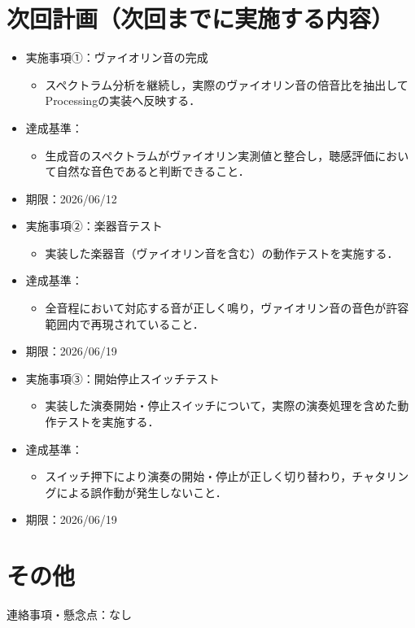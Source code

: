 \documentclass[lualatex,paper=a4paper,jafontsize=11.5pt,jafontscale=1.05]{jlreq}
\begin{document}
\section{次回計画（次回までに実施する内容）}
\begin{itemize}
  \item 実施事項①：ヴァイオリン音の完成
  \begin{itemize}
    \item スペクトラム分析を継続し，実際のヴァイオリン音の倍音比を抽出してProcessingの実装へ反映する．
  \end{itemize}
  \item 達成基準：
  \begin{itemize}
    \item 生成音のスペクトラムがヴァイオリン実測値と整合し，聴感評価において自然な音色であると判断できること．
  \end{itemize}
  \item 期限：2026/06/12

  \item 実施事項②：楽器音テスト
  \begin{itemize}
    \item 実装した楽器音（ヴァイオリン音を含む）の動作テストを実施する．
  \end{itemize}
  \item 達成基準：
  \begin{itemize}
    \item 全音程において対応する音が正しく鳴り，ヴァイオリン音の音色が許容範囲内で再現されていること．
  \end{itemize}
  \item 期限：2026/06/19

  \item 実施事項③：開始停止スイッチテスト
  \begin{itemize}
    \item 実装した演奏開始・停止スイッチについて，実際の演奏処理を含めた動作テストを実施する．
  \end{itemize}
  \item 達成基準：
  \begin{itemize}
    \item スイッチ押下により演奏の開始・停止が正しく切り替わり，チャタリングによる誤作動が発生しないこと．
  \end{itemize}
  \item 期限：2026/06/19
\end{itemize}

\section{その他}
連絡事項・懸念点：なし
\end{document}
